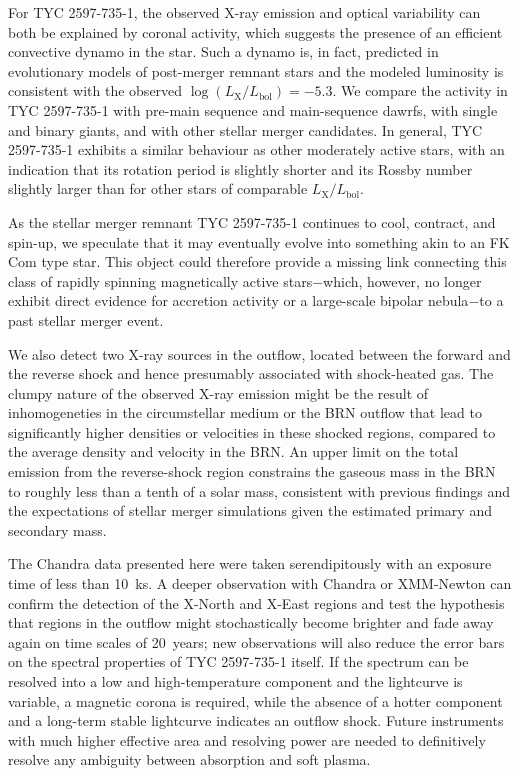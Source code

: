 \documentclass[linenumbers]{aastex631}
\begin{document}
For TYC 2597-735-1, the observed X-ray emission and optical variability can both be explained by coronal activity, which suggests the presence of an efficient convective dynamo in the star. Such a dynamo is, in fact, predicted in evolutionary models of post-merger remnant stars and the modeled luminosity is consistent with the observed $\log(L_\mathrm{X}/L_\mathrm{bol})=-5.3$.  We compare the activity in TYC 2597-735-1 with pre-main sequence and main-sequence dawrfs, with single and binary giants, and with other stellar merger candidates. In general, TYC 2597-735-1 exhibits a similar behaviour as other moderately active stars, with an indication that its rotation period is slightly shorter and its Rossby number slightly larger than for other stars of comparable $L_\mathrm{X}/L_\mathrm{bol}$.

As the stellar merger remnant TYC 2597-735-1 continues to cool, contract, and spin-up, we speculate that it may eventually evolve into something akin to an FK Com type star.  This object could therefore provide a missing link connecting this class of rapidly spinning magnetically active stars$-$which, however, no longer exhibit direct evidence for accretion activity or a large-scale bipolar nebula$-$to a past stellar merger event.

We also detect two X-ray sources in the outflow, located between the forward and the reverse shock and hence presumably associated with shock-heated gas. The clumpy nature of the observed X-ray emission might be the result of inhomogeneties in the circumstellar medium or the BRN outflow that lead to significantly higher densities or velocities in these shocked regions, compared to the average density and velocity in the BRN. An upper limit on the total emission from the reverse-shock region constrains the gaseous mass in the BRN to roughly less than a tenth of a solar mass, consistent with previous findings \citep{2020Natur.587..387H} and the expectations of stellar merger simulations given the estimated primary and secondary mass.

The Chandra data presented here were taken serendipitously with an exposure time of less than 10~ks. A deeper observation with Chandra or XMM-Newton can confirm the detection of the X-North and X-East regions and test the hypothesis that regions in the outflow might stochastically become brighter and fade away again on time scales of 20~years; new observations will also reduce the error bars on the spectral properties of TYC 2597-735-1 itself. If the spectrum can be resolved into a low and high-temperature component and the lightcurve is variable, a magnetic corona is required, while the absence of a hotter component and a long-term stable lightcurve indicates an outflow shock. Future instruments with much higher effective area and resolving power are needed to definitively resolve any ambiguity between absorption and soft plasma.
\end{document}
